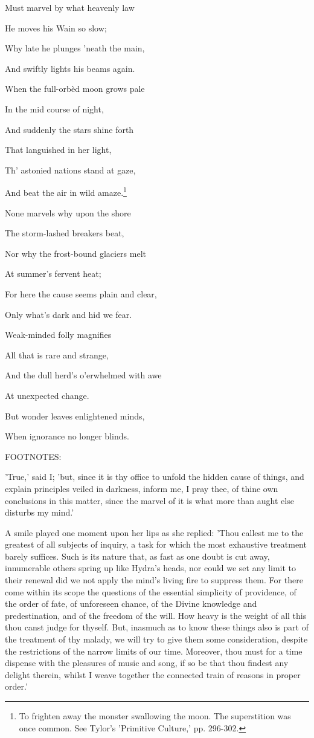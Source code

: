 Must marvel by what heavenly law

He moves his Wain so slow;

Why late he plunges 'neath the main,

And swiftly lights his beams again.

When the full-orbèd moon grows pale

In the mid course of night,

And suddenly the stars shine forth

That languished in her light,

Th' astonied nations stand at gaze,

And beat the air in wild amaze.\footnote{To frighten away the monster swallowing the moon. The
superstition was once common. See Tylor's 'Primitive Culture,' pp.
296-302.}

None marvels why upon the shore

The storm-lashed breakers beat,

Nor why the frost-bound glaciers melt

At summer's fervent heat;

For here the cause seems plain and clear,

Only what's dark and hid we fear.

Weak-minded folly magnifies

All that is rare and strange,

And the dull herd's o'erwhelmed with awe

At unexpected change.

But wonder leaves enlightened minds,

When ignorance no longer blinds.

FOOTNOTES:


'True,' said I; 'but, since it is thy office to unfold the hidden cause
of things, and explain principles veiled in darkness, inform me, I pray
thee, of thine own conclusions in this matter, since the marvel of it is
what more than aught else disturbs my mind.'

A smile played one moment upon her lips as she replied: 'Thou callest me
to the greatest of all subjects of inquiry, a task for which the most
exhaustive treatment barely suffices. Such is its nature that, as fast
as one doubt is cut away, innumerable others spring up like Hydra's
heads, nor could we set any limit to their renewal did we not apply the
mind's living fire to suppress them. For there come within its scope the
questions of the essential simplicity of providence, of the order of
fate, of unforeseen chance, of the Divine knowledge and predestination,
and of the freedom of the will. How heavy is the weight of all this
thou canst judge for thyself. But, inasmuch as to know these things also
is part of the treatment of thy malady, we will try to give them some
consideration, despite the restrictions of the narrow limits of our
time. Moreover, thou must for a time dispense with the pleasures of
music and song, if so be that thou findest any delight therein, whilst I
weave together the connected train of reasons in proper order.'

